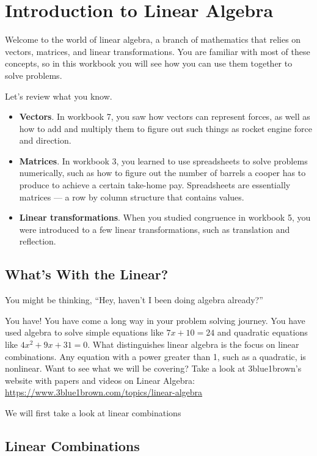 \chapter{Introduction to Linear Algebra}

Welcome to the world of linear algebra, a branch of mathematics that relies on 
vectors, matrices, and linear transformations. You are familiar with most of 
these concepts, so in this workbook you will see how you can use them together 
to solve problems.  

Let's review what you know.

\begin{itemize}
\item \textbf{Vectors}. In workbook 7, you saw how vectors can represent 
forces, as well as how to add and multiply them to figure out such things as 
rocket engine force and direction. 
\item \textbf{Matrices}. In workbook 3, you learned to use spreadsheets to 
solve problems numerically, such as how to figure out the number of barrels a 
cooper has to produce to achieve a certain take-home pay. Spreadsheets are 
essentially matrices --- a row by column structure that contains values. 
\item \textbf{Linear transformations}. When you studied congruence in workbook 
5, you were introduced to a few linear transformations, such as translation 
and reflection. 
\end{itemize}

\section{What's With the Linear?}

You might be thinking, “Hey, haven't I been doing algebra already?” 

You have! You have come a long way in your problem solving journey. You have 
used algebra to solve simple equations like $7x + 10 = 24$ and quadratic 
equations like $4x^{2} + 9x + 31 = 0$. What distinguishes linear algebra is 
the focus on linear combinations. Any equation with a power greater than 1, 
such as a quadratic, is nonlinear.
Want to see what we will be covering? Take a look at 3blue1brown's website with papers and videos on Linear Algebra: 
\url{https://www.3blue1brown.com/topics/linear-algebra}

We will first take a look at linear combinations

\section{Linear Combinations}

